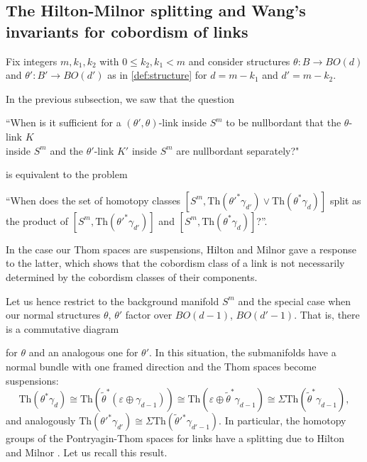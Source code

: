 \documentclass[a4paper, 11pt,reqno]{amsart}
\theoremstyle{plain}
\theoremstyle{definition}
\newcommand{\Th}{\mathrm{Th}}
\begin{document}
\subsection{The Hilton-Milnor splitting and Wang's invariants for cobordism of links}
Fix integers $m,k_1,k_2$ with $0\leq k_2,k_1<m$ and consider structures $\theta\colon B\to BO(d)$ and $\theta'\colon B'\to BO(d')$ as in \cref{def:structure} for $d=m-k_1$ and $d'=m-k_2$.\par
In the previous subsection, we saw that the question 
\begin{center}``When is it sufficient for a $(\theta',\theta)$-link inside $S^m$ to be nullbordant that the $\theta$-link $K$\\
inside $S^m$ and the $\theta'$-link $K'$ inside $S^m$ are nullbordant separately?"\end{center}
is equivalent to the problem
\begin{center}
``When does the set of homotopy classes $[S^m,\Th(\theta'^\ast\gamma_{d'})\vee\Th(\theta^\ast\gamma_{d})]$ split as\\
the product of $[S^m,\Th(\theta'^\ast\gamma_{d'})]$ and $[S^m,\Th(\theta^\ast\gamma_{d})]$?''.
\end{center}
In the case our Thom spaces are suspensions, Hilton and Milnor \cite{hilton,milnor} gave a response to the latter, which shows that the cobordism class of a link is not necessarily determined by the cobordism classes of their components.\par
Let us hence restrict to the background manifold $S^m$ and the special case when our normal structures $\theta$, $\theta'$ factor over $BO(d-1)$, $BO(d'-1)$. That is, there is a commutative diagram
\begin{center}
\end{center}
for $\theta$ and an analogous one for $\theta'$. In this situation, the submanifolds have a normal bundle with one framed direction and the Thom spaces become suspensions:
\[
\Th(\theta^\ast\gamma_{d})\cong\Th(\widetilde{\theta}^\ast(\varepsilon\oplus\gamma_{d-1}))\cong\Th(\varepsilon\oplus\widetilde{\theta}^\ast\gamma_{d-1})\cong\Sigma\Th(\widetilde{\theta}^\ast\gamma_{d-1}),\]
and analogously $\Th(\theta'^\ast\gamma_{d'})\cong\Sigma\Th(\widetilde{\theta}'^\ast\gamma_{d'-1})$. In particular, the homotopy groups of the Pontryagin-Thom spaces for links have a splitting due to Hilton and Milnor \cite{hilton,milnor}. Let us recall this result.\par
\end{document}
